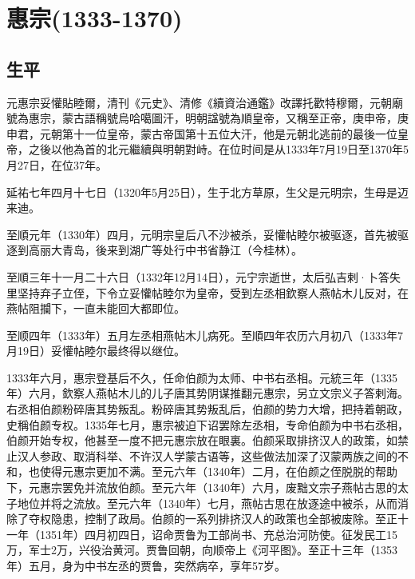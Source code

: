 
\section{惠宗\tiny(1333-1370)}

\subsection{生平}

元惠宗妥懽貼睦爾，清刊《元史》、清修《續資治通鑑》改譯托歡特穆爾，元朝廟號為惠宗，蒙古語稱號烏哈噶圖汗，明朝諡號為順皇帝，又稱至正帝，庚申帝，庚申君，元朝第十一位皇帝，蒙古帝国第十五位大汗，他是元朝北逃前的最後一位皇帝，之後以他為首的北元繼續與明朝對峙。在位时间是从1333年7月19日至1370年5月27日，在位37年。

延祐七年四月十七日（1320年5月25日），生于北方草原，生父是元明宗，生母是迈来迪。

至順元年（1330年）四月，元明宗皇后八不沙被杀，妥懽帖睦尔被驱逐，首先被驱逐到高丽大青岛，後来到湖广等处行中书省静江（今桂林）。

至順三年十一月二十六日（1332年12月14日），元宁宗逝世，太后弘吉剌·卜答失里坚持弃子立侄，下令立妥懽帖睦尔为皇帝，受到左丞相欽察人燕帖木儿反对，在燕帖阻攔下，一直未能回大都即位。

至顺四年（1333年）五月左丞相燕帖木儿病死。至順四年农历六月初八（1333年7月19日）妥懽帖睦尔最终得以继位。

1333年六月，惠宗登基后不久，任命伯颜为太师、中书右丞相。元統三年（1335年）六月，欽察人燕帖木儿的儿子唐其势阴谋推翻元惠宗，另立文宗义子答剌海。右丞相伯颜粉碎唐其势叛乱。粉碎唐其势叛乱后，伯颜的势力大增，把持着朝政，史稱伯颜专权。1335年七月，惠宗被迫下诏罢除左丞相，专命伯颜为中书右丞相，伯颜开始专权，他甚至一度不把元惠宗放在眼裏。伯颜采取排挤汉人的政策，如禁止汉人参政、取消科举、不许汉人学蒙古语等，这些做法加深了汉蒙两族之间的不和，也使得元惠宗更加不满。至元六年（1340年）二月，在伯颜之侄脱脱的帮助下，元惠宗罢免并流放伯颜。至元六年（1340年）六月，废黜文宗子燕帖古思的太子地位并将之流放。至元六年（1340年）七月，燕帖古思在放逐途中被杀，从而消除了夺权隐患，控制了政局。伯颜的一系列排挤汉人的政策也全部被废除。至正十一年（1351年）四月初四日，诏命贾鲁为工部尚书、充总治河防使。征发民工15万，军士2万，兴役治黄河。贾鲁回朝，向顺帝上《河平图》。至正十三年（1353年）五月，身为中书左丞的贾鲁，突然病卒，享年57岁。


